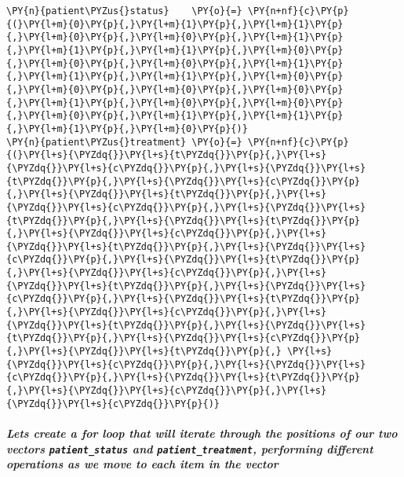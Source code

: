     \begin{tcolorbox}[breakable, size=fbox, boxrule=1pt, pad at break*=1mm,colback=cellbackground, colframe=cellborder]
\begin{Verbatim}[commandchars=\\\{\}]
\PY{n}{patient\PYZus{}status}    \PY{o}{=} \PY{n+nf}{c}\PY{p}{(}\PY{l+m}{0}\PY{p}{,}\PY{l+m}{1}\PY{p}{,}\PY{l+m}{1}\PY{p}{,}\PY{l+m}{0}\PY{p}{,}\PY{l+m}{0}\PY{p}{,}\PY{l+m}{1}\PY{p}{,}\PY{l+m}{1}\PY{p}{,}\PY{l+m}{1}\PY{p}{,}\PY{l+m}{0}\PY{p}{,}\PY{l+m}{0}\PY{p}{,}\PY{l+m}{0}\PY{p}{,}\PY{l+m}{1}\PY{p}{,}\PY{l+m}{1}\PY{p}{,}\PY{l+m}{1}\PY{p}{,}\PY{l+m}{0}\PY{p}{,}\PY{l+m}{0}\PY{p}{,}\PY{l+m}{0}\PY{p}{,}\PY{l+m}{0}\PY{p}{,}\PY{l+m}{1}\PY{p}{,}\PY{l+m}{0}\PY{p}{,}\PY{l+m}{0}\PY{p}{,}\PY{l+m}{0}\PY{p}{,}\PY{l+m}{1}\PY{p}{,}\PY{l+m}{1}\PY{p}{,}\PY{l+m}{1}\PY{p}{,}\PY{l+m}{0}\PY{p}{)}
\PY{n}{patient\PYZus{}treatment} \PY{o}{=} \PY{n+nf}{c}\PY{p}{(}\PY{l+s}{\PYZdq{}}\PY{l+s}{t\PYZdq{}}\PY{p}{,}\PY{l+s}{\PYZdq{}}\PY{l+s}{c\PYZdq{}}\PY{p}{,}\PY{l+s}{\PYZdq{}}\PY{l+s}{t\PYZdq{}}\PY{p}{,}\PY{l+s}{\PYZdq{}}\PY{l+s}{c\PYZdq{}}\PY{p}{,}\PY{l+s}{\PYZdq{}}\PY{l+s}{t\PYZdq{}}\PY{p}{,}\PY{l+s}{\PYZdq{}}\PY{l+s}{c\PYZdq{}}\PY{p}{,}\PY{l+s}{\PYZdq{}}\PY{l+s}{t\PYZdq{}}\PY{p}{,}\PY{l+s}{\PYZdq{}}\PY{l+s}{t\PYZdq{}}\PY{p}{,}\PY{l+s}{\PYZdq{}}\PY{l+s}{c\PYZdq{}}\PY{p}{,}\PY{l+s}{\PYZdq{}}\PY{l+s}{t\PYZdq{}}\PY{p}{,}\PY{l+s}{\PYZdq{}}\PY{l+s}{c\PYZdq{}}\PY{p}{,}\PY{l+s}{\PYZdq{}}\PY{l+s}{t\PYZdq{}}\PY{p}{,}\PY{l+s}{\PYZdq{}}\PY{l+s}{c\PYZdq{}}\PY{p}{,}\PY{l+s}{\PYZdq{}}\PY{l+s}{t\PYZdq{}}\PY{p}{,}\PY{l+s}{\PYZdq{}}\PY{l+s}{c\PYZdq{}}\PY{p}{,}\PY{l+s}{\PYZdq{}}\PY{l+s}{t\PYZdq{}}\PY{p}{,}\PY{l+s}{\PYZdq{}}\PY{l+s}{c\PYZdq{}}\PY{p}{,}\PY{l+s}{\PYZdq{}}\PY{l+s}{t\PYZdq{}}\PY{p}{,}\PY{l+s}{\PYZdq{}}\PY{l+s}{t\PYZdq{}}\PY{p}{,}\PY{l+s}{\PYZdq{}}\PY{l+s}{c\PYZdq{}}\PY{p}{,}\PY{l+s}{\PYZdq{}}\PY{l+s}{t\PYZdq{}}\PY{p}{,} \PY{l+s}{\PYZdq{}}\PY{l+s}{c\PYZdq{}}\PY{p}{,}\PY{l+s}{\PYZdq{}}\PY{l+s}{c\PYZdq{}}\PY{p}{,}\PY{l+s}{\PYZdq{}}\PY{l+s}{t\PYZdq{}}\PY{p}{,}\PY{l+s}{\PYZdq{}}\PY{l+s}{c\PYZdq{}}\PY{p}{,}\PY{l+s}{\PYZdq{}}\PY{l+s}{c\PYZdq{}}\PY{p}{)}
\end{Verbatim}
\end{tcolorbox}

    \hypertarget{lets-create-a-for-loop-that-will-iterate-through-the-positions-of-our-two-vectors-patient_status-and-patient_treatment-performing-different-operations-as-we-move-to-each-item-in-the-vector}{%
\subparagraph{\texorpdfstring{Lets create a for loop that will iterate
through the positions of our two vectors \texttt{patient\_status} and
\texttt{patient\_treatment}, performing different operations as we move
to each item in the
vector}{Lets create a for loop that will iterate through the positions of our two vectors patient\_status and patient\_treatment, performing different operations as we move to each item in the vector}}\label{lets-create-a-for-loop-that-will-iterate-through-the-positions-of-our-two-vectors-patient_status-and-patient_treatment-performing-different-operations-as-we-move-to-each-item-in-the-vector}}

